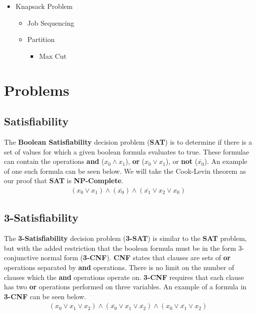 \begin{itemize}
\begin{itemize}
\begin{itemize}
\begin{itemize}
\begin{itemize}
                        \item Knapsack Problem
                        \begin{itemize}
                            \item Job Sequencing
                            \item Partition
                            \begin{itemize}
                                \item Max Cut
                            \end{itemize}
                        \end{itemize}
                    \end{itemize}
                \end{itemize}
            \end{itemize}
        \end{itemize}
    \end{itemize}

\section{Problems}
\subsection{Satisfiability}
    The \textbf{Boolean Satisfiability} decision problem (\textbf{SAT}) is to determine if there is a set of values for which a given boolean formula evaluates to true. These formulae can contain the operations \textbf{and} ($x_0 \land x_1$), \textbf{or} ($x_0 \lor x_1$), or \textbf{not} ($\overline{x_0}$). An example of one such formula can be seen below. We will take the Cook-Levin theorem as our proof that \textbf{SAT} is \textbf{NP-Complete}. 
    \begin{align*}
        (x_0 \lor x_1) \land (\overline{x_0}) \land (\overline{x_1} \lor x_2 \lor x_0)
    \end{align*}
\subsection{3-Satisfiability}
    The \textbf{3-Satisfiability} decision problem (\textbf{3-SAT}) is similar to the \textbf{SAT} problem, but with the added restriction that the boolean formula must be in the form 3-conjunctive normal form (\textbf{3-CNF}). \textbf{CNF} states that clauses are sets of \textbf{or} operations separated by \textbf{and} operations. There is no limit on the number of clauses which the \textbf{and} operations operate on. \textbf{3-CNF} requires that each clause has two \textbf{or} operations performed on three variables. An example of a formula in \textbf{3-CNF} can be seen below.
    \begin{align*}
        (x_0 \lor x_1 \lor x_2) \land (\overline{x_0} \lor x_1 \lor \overline{x_2}) \land (x_0 \lor \overline{x_1} \lor x_2)
    \end{align*}
